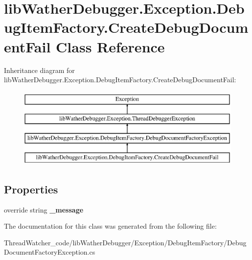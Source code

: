 \hypertarget{classlib_wather_debugger_1_1_exception_1_1_debug_item_factory_1_1_create_debug_document_fail}{\section{lib\+Wather\+Debugger.\+Exception.\+Debug\+Item\+Factory.\+Create\+Debug\+Document\+Fail Class Reference}
\label{classlib_wather_debugger_1_1_exception_1_1_debug_item_factory_1_1_create_debug_document_fail}
}
Inheritance diagram for lib\+Wather\+Debugger.\+Exception.\+Debug\+Item\+Factory.\+Create\+Debug\+Document\+Fail\+:\begin{figure}[H]
\begin{center}
\leavevmode
\includegraphics[height=4.000000cm]{classlib_wather_debugger_1_1_exception_1_1_debug_item_factory_1_1_create_debug_document_fail}
\end{center}
\end{figure}
\subsection*{Properties}
\begin{DoxyCompactItemize}
\item 
\hypertarget{classlib_wather_debugger_1_1_exception_1_1_debug_item_factory_1_1_create_debug_document_fail_ab7aab7031662fcaa63a7c08ac168cece}{override string {\bfseries \+\_\+message}}\label{classlib_wather_debugger_1_1_exception_1_1_debug_item_factory_1_1_create_debug_document_fail_ab7aab7031662fcaa63a7c08ac168cece}

\end{DoxyCompactItemize}


The documentation for this class was generated from the following file\+:\begin{DoxyCompactItemize}
\item 
Thread\+Watcher\+\_\+code/lib\+Wather\+Debugger/\+Exception/\+Debug\+Item\+Factory/Debug\+Document\+Factory\+Exception.\+cs\end{DoxyCompactItemize}
